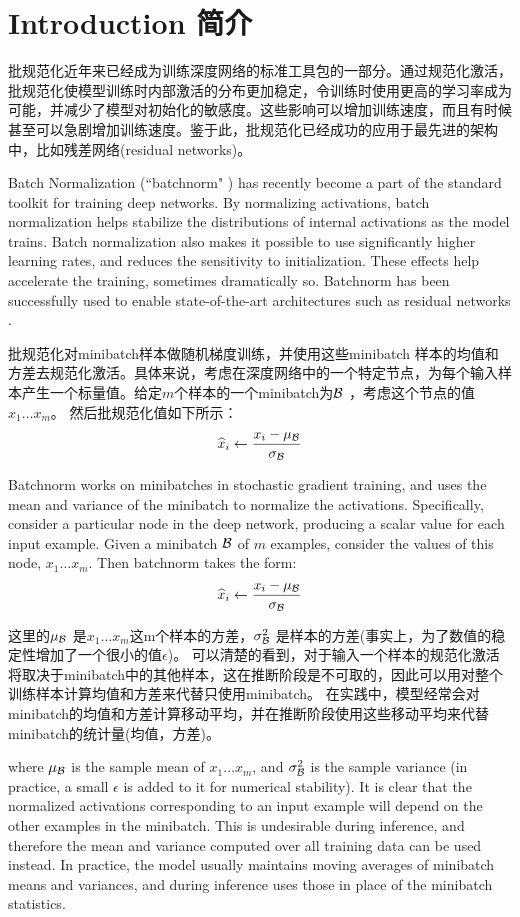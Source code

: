 \section{Introduction 简介}
批规范化近年来已经成为训练深度网络的标准工具包的一部分。通过规范化激活，批规范化使模型训练时内部激活的分布更加稳定，令训练时使用更高的学习率成为可能，并减少了模型对初始化的敏感度。这些影响可以增加训练速度，而且有时候甚至可以急剧增加训练速度。鉴于此，批规范化已经成功的应用于最先进的架构中，比如残差网络(residual networks)。

Batch Normalization (``batchnorm" \cite{batchnorm}) has recently become a part of the standard toolkit for training deep networks. By normalizing activations, batch normalization helps stabilize the distributions of internal activations as the model trains. Batch normalization also makes it possible to use significantly higher learning rates, and reduces the sensitivity to initialization. These effects help accelerate the training, sometimes dramatically so. Batchnorm has been successfully used to enable  state-of-the-art architectures such as residual networks \cite{resnet}.

批规范化对minibatch样本做随机梯度训练，并使用这些minibatch 样本的均值和方差去规范化激活。具体来说，考虑在深度网络中的一个特定节点，为每个输入样本产生一个标量值。给定$m$个样本的一个minibatch为$\mathcal{B}$ ，考虑这个节点的值$x_1\ldots x_m$。 然后批规范化值如下所示：
$$
\widehat{x}_i \leftarrow \frac{x_i-\mu_{\mathcal{B}}}{\sigma_{\mathcal{B}}}
$$

Batchnorm works on minibatches in stochastic gradient training, and uses the mean and variance of the minibatch  to normalize the activations. Specifically, consider a particular node in the deep network, producing a scalar value for each input example. Given a minibatch $\mathcal{B}$ of $m$ examples, consider the values of this node, $x_1\ldots x_m$. Then batchnorm takes the form:
$$
\widehat{x}_i \leftarrow \frac{x_i-\mu_{\mathcal{B}}}{\sigma_{\mathcal{B}}}
$$

这里的$\mu_{\mathcal{B}}$ 是$x_1\ldots x_m$这m个样本的方差，$\sigma_{\mathcal{B}}^2$ 是样本的方差(事实上，为了数值的稳定性增加了一个很小的值$\epsilon$)。
可以清楚的看到，对于输入一个样本的规范化激活将取决于minibatch中的其他样本，这在推断阶段是不可取的，因此可以用对整个训练样本计算均值和方差来代替只使用minibatch。
在实践中，模型经常会对minibatch的均值和方差计算移动平均，并在推断阶段使用这些移动平均来代替minibatch的统计量(均值，方差)。

where $\mu_{\mathcal{B}}$ is the sample mean of $x_1\ldots x_m$, and $\sigma_{\mathcal{B}}^2$ is the sample variance (in practice, a small $\epsilon$ is added to it for numerical stability). It is clear that the normalized activations corresponding to an input example will depend on the other examples in the  minibatch. This is undesirable during inference, and therefore the mean and variance computed over all training data can be used instead. In practice, the model usually maintains moving averages of minibatch means and variances, and during inference uses those in place of the minibatch statistics.

